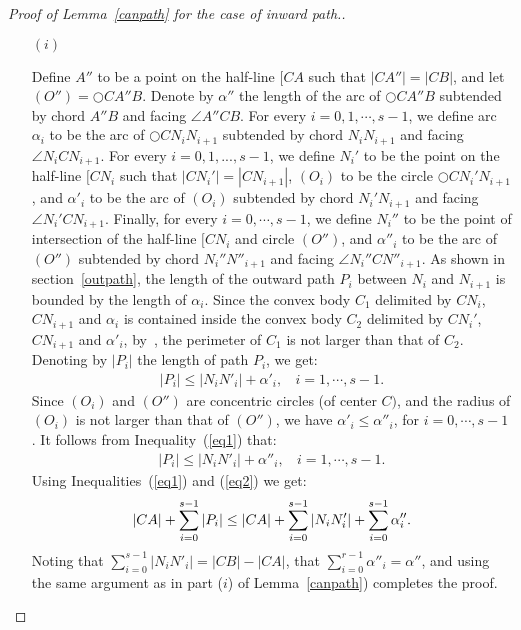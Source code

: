 \documentclass{stacs_proc}
\theoremstyle{plain}\newtheorem{satz}[thm]{Satz}
\begin{document}
\begin{proof}[Proof of Lemma~\ref{canpath} for the case of inward
path.]
\begin{itemize}
\item[]
\item[$(i)$]


Define $A''$ to be a point on the half-line $[CA$ such that $|CA''|
= |CB|$, and let $(O'') =\bigcirc{CA''B}$. Denote by $\alpha''$ the
length of the arc of $\bigcirc{CA''B}$ subtended by chord $A''B$ and
facing $\angle{A''CB}$. For every $i = 0, 1, \cdots, s-1$, we define
arc $\alpha_i$ to be the arc of $\bigcirc{CN_iN_{i+1}}$ subtended by
chord $N_iN_{i+1}$ and facing $\angle{N_iCN_{i+1}}$. For every $i =
0, 1, ..., s-1$, we define $N_i'$ to be the point on the half-line
$[CN_i$ such that $|CN_i'| = |CN_{i+1}|$, $(O_i)$ to be the circle
$\bigcirc{CN_i'N_{i+1}}$, and $\alpha'_{i}$ to be the arc of $(O_i)$
subtended by chord $N_i'N_{i+1}$ and facing $\angle{N_i'CN_{i+1}}$.
Finally, for every $i =0, \cdots, s-1$, we define $N_i''$ to be the
point of intersection of the half-line $[CN_i$ and circle $(O'')$,
and $\alpha''_i$ to be the arc of $(O'')$ subtended by chord
$N_i''N''_{i+1}$ and facing $\angle{N_i''CN''_{i+1}}$. As shown in
section~\ref{outpath}, the length of the outward path $P_i$ between
$N_i$ and $N_{i+1}$ is bounded by the length of $\alpha_i$. Since
the convex body $C_1$ delimited by $CN_i$, $CN_{i+1}$ and $\alpha_i$
is contained inside the convex body $C_2$ delimited by $CN_i'$,
$CN_{i+1}$ and $\alpha'_i$, by~\cite{bookconvexity}, the perimeter
of $C_1$ is not larger than that of $C_2$. Denoting by $|P_i|$ the
length of path $P_i$, we get:
\begin{eqnarray}
|P_i| \leq |N_iN'_{i}| + \alpha'_i, \ \ \ \ i = 1, \cdots, s-1.
\label{eq1}
\end{eqnarray}
Since $(O_i)$ and $(O'')$ are concentric circles (of center $C)$,
and the radius of $(O_i)$ is not larger than that of $(O'')$, we
have $\alpha'_i \leq \alpha''_i$, for $i=0, \cdots, s-1$. It follows
from Inequality~(\ref{eq1}) that:
\begin{eqnarray}
|P_i| \leq |N_iN'_{i}| + \alpha''_i, \ \ \ \ i = 1, \cdots, s-1.
\label{eq2}
\end{eqnarray}
Using Inequalities~(\ref{eq1}) and (\ref{eq2}) we get:
\begin{eqnarray}
\hspace*{-2mm} |CA| + \sum_{i=0}^{s-1}|P_i| \leq |CA| +
\sum_{i=0}^{s-1} |N_iN'_{i}| + \sum_{i=0}^{s-1} \alpha''_i.
\hspace*{-2mm}\label{eq3}
\end{eqnarray}
Noting that $\sum_{i=0}^{s-1} |N_iN'_{i}| = |CB| - |CA|$, that
$\sum_{i=0}^{r-1} \alpha''_i = \alpha''$, and using the same argument as in
part ($i$) of Lemma~\ref{canpath}) completes the proof.


\end{itemize}
\end{proof}
\end{document}
